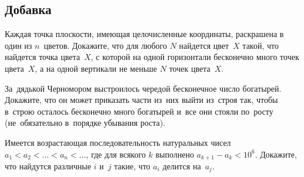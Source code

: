
\subsection*{Добавка}




\begin{problems}

\item
Каждая точка плоскости, имеющая целочисленные координаты, раскрашена в один
из $n$~цветов.
Докажите, что для любого $N$ найдется цвет~$X$ такой, что найдется точка
цвета~$X$, с которой на одной горизонтали бесконечно много точек цвета~$X$,
а на одной вертикали не меньше $N$ точек цвета~$X$.

\item
За~дядькой Черномором выстроилось чередой бесконечное число богатырей.
Докажите, что он может приказать части из~них выйти из~строя так, чтобы в~строю
осталось бесконечно много богатырей и~все они стояли по~росту (не~обязательно
в~порядке убывания роста).

\item
Имеется возрастающая последовательность натуральных чисел
$a_{1} < a_{2} < \ldots < a_{n} < \ldots$, где для всякого $k$ выполнено
$a_{k+1} - a_{k} < 10^6$.
Докажите, что найдутся различные $i$ и~$j$ такие, что $a_i$ делится на~$a_j$.

\end{problems}

